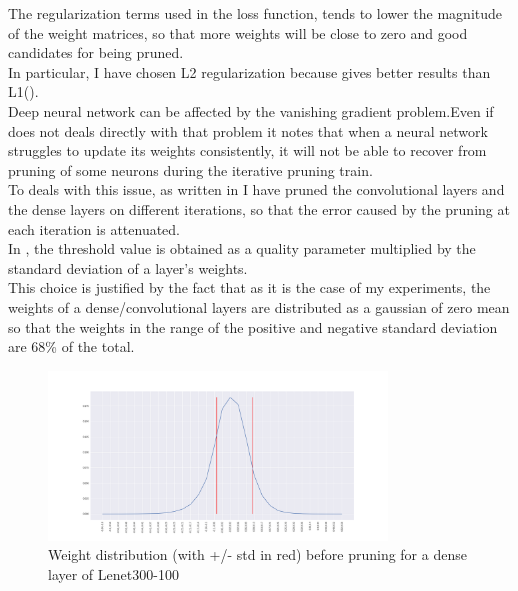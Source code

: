 \documentclass[journal]{vgtc}                %
\begin{document}
The regularization terms used in the loss function, tends to lower the magnitude of the weight matrices, so that more weights will be close to zero and good candidates for being pruned.\\In particular, I have chosen L2 regularization because gives better results than L1(\cite{p1}).\\Deep neural network can be affected by the vanishing gradient problem.Even if \cite{p1} does not deals directly with that problem it notes that when a neural network struggles to update its weights consistently, it will not be able to recover from pruning of some neurons during the iterative pruning train. \\To deals with this issue, as written in  \cite{p1} I have pruned the convolutional layers and the dense layers on different iterations, so that the error caused by the pruning at each iteration is attenuated.\\In \cite{p1}, the threshold value is obtained as a quality parameter multiplied by the standard deviation of a layer's weights.\\This choice is justified by the fact that as it is the case of my experiments, the weights of a dense/convolutional layers are distributed as a gaussian of zero mean so that the weights in the range of the positive and negative standard deviation are 68\% of the total.
\begin{figure}[H]
	\hspace*{-1cm}
	\includegraphics[width=90mm,scale=0.7]{weigth-dis}
	\caption{Weight distribution  (with +/- std in red) before pruning for a dense layer of Lenet300-100 }
\end{figure}
\end{document}
